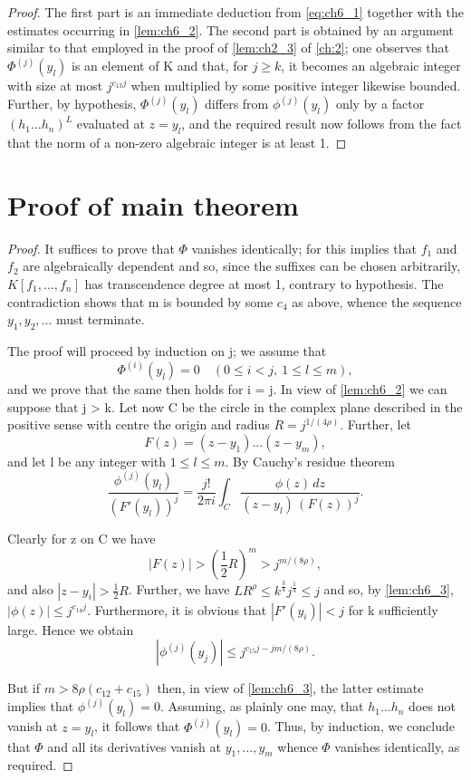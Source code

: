 \begin{proof}
The first part is an immediate deduction from \eqref{eq:ch6_1} together with the estimates occurring in \autoref{lem:ch6_2}. The second part is obtained by an argument similar to that employed in the proof of \autoref{lem:ch2_3} of \autoref{ch:2}; one observes that $\Phi^{(j)}(y_l)$ is an element of K and that, for $j \ge k$, it becomes an algebraic integer with size at most $j^{c_{13}j}$ when multiplied by some positive integer likewise bounded. Further, by hypothesis, $\Phi^{(j)}(y_l)$ differs from $\phi^{(j)}(y_l)$ only by a factor $(h_1 \dots h_n)^L$ evaluated at $z = y_l$, and the required result now follows from the fact that the norm of a non-zero algebraic integer is at least 1.
\end{proof}

\section{Proof of main theorem}

\begin{proof}
It suffices to prove that $\Phi$ vanishes identically; for this implies that $f_1$ and $f_2$ are algebraically dependent and so, since the suffixes can be chosen arbitrarily, $K[f_1, \dots, f_n]$ has transcendence degree at most 1, contrary to hypothesis. The contradiction shows that m is bounded by some $c_4$ as above, whence the sequence $y_1, y_2, \dots$ must terminate.

The proof will proceed by induction on j; we assume that
\[\Phi^{(i)}(y_l) = 0 \quad (0 \le i < j, \ 1 \le l \le m),\]
and we prove that the same then holds for i = j. In view of \autoref{lem:ch6_2} we can suppose that j > k. Let now C be the circle in the complex plane described in the positive sense with centre the origin and radius $R = j^{1/(4\rho)}$. Further, let
\[F(z) = (z - y_1) \dots (z - y_m),\]
and let l be any integer with $1 \leq l \leq m$. By Cauchy's residue theorem
\[\frac{\phi^{(j)}(y_l)}{(F'(y_l))^j} = \frac{j!}{2\pi i} \int_C \frac{\phi(z)\,dz}{(z-y_l)\,(F(z))^j}.\]

Clearly for z on C we have
\[|F(z)| > (\frac{1}{2}R)^m > j^{m/(8\rho)},\]
and also $|z-y_i| > \frac{1}{2}R$. Further, we have $LR^{\rho} \leq k^{\frac{3}{4}}j^{\frac{1}{4}} \leq j$ and so, by \autoref{lem:ch6_3}, $|\phi(z)| \leq j^{c_{14}j}$. Furthermore, it is obvious that $|F'(y_i)| < j$ for k sufficiently large. Hence we obtain
\[|\phi^{(j)}(y_j)| \leq j^{c_{15}j-jm/(8\rho)}.\]

But if $m > 8\rho(c_{12} + c_{15})$ then, in view of \autoref{lem:ch6_3}, the latter estimate implies that $\phi^{(j)}(y_l) = 0$. Assuming, as plainly one may, that $h_1 \dots h_n$ does not vanish at $z = y_l$, it follows that $\Phi^{(j)}(y_l) = 0$. Thus, by induction, we conclude that $\Phi$ and all its derivatives vanish at $y_1, \dots, y_m$ whence $\Phi$ vanishes identically, as required.
\end{proof}

